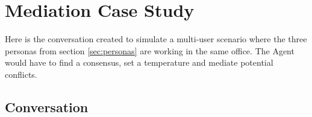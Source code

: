 \section{Mediation Case Study}

Here is the conversation created to simulate a multi-user scenario where the three personas from section \ref{sec:personas} are working in the same office. The Agent would have to find a consensus, set a temperature and mediate potential conflicts.

\subsection{Conversation}

